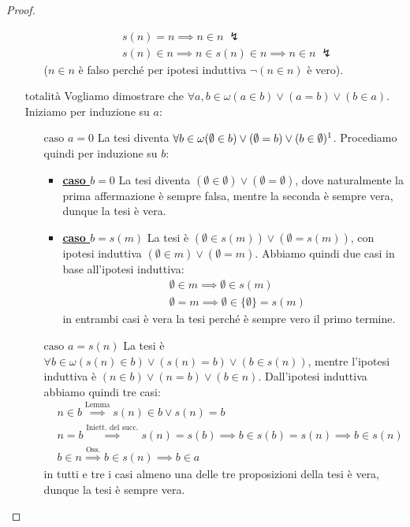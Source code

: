 \begin{proof}
\begin{itemize}
\begin{itemize}
			\[ \begin{split}
				& s(n) = n \implies n \in n \; \lightning\\
				& s(n) \in n \implies n \in s(n) \in n \implies n \in n \; \lightning
			\end{split}
				\]
			($n \in n$ è falso perché per ipotesi induttiva $\neg(n \in n)$ è vero).
		\end{itemize}
		\item[$\boxed{\text{totalità}}$] Vogliamo dimostrare che $\forall a,b \in \omega (a \in b) \lor (a = b) \lor (b \in a)$. Iniziamo per induzione su $a$:
		\begin{itemize}
			\item[$\boxed{\text{caso $a = 0$}}$] La tesi diventa $\forall b \in \omega (\emptyset \in b) \lor (\emptyset = b) \lor (b \in \emptyset) \footnote{Ovviamente quest'ultimo caso è sempre faslo e quindi può essere escluso.}$. Procediamo quindi per induzione su $b$:
			\begin{itemize}
				\item \textbf{\underline{caso $b = 0$}} La tesi diventa $(\emptyset \in \emptyset) \lor (\emptyset = \emptyset)$, dove naturalmente la prima affermazione è sempre falsa, mentre la seconda è sempre vera, dunque la tesi è vera.
				\item \textbf{\underline{caso $b = s(m)$}} La tesi è $(\emptyset \in s(m)) \lor (\emptyset = s(m))$, con ipotesi induttiva $(\emptyset \in m) \lor (\emptyset = m)$. Abbiamo quindi due casi in base all'ipotesi induttiva:
				\[ \begin{split}
					& \emptyset \in m \implies \emptyset \in s(m) \\
					& \emptyset = m \implies \emptyset \in \{\emptyset\} = s(m)
				\end{split}
					\]
				in entrambi casi è vera la tesi perché è sempre vero il primo termine.
			\end{itemize}
			\item[$\boxed{\text{caso $a = s(n)$}}$] La tesi è $\forall b \in \omega (s(n) \in b) \lor (s(n) = b) \lor (b \in s(n))$, mentre l'ipotesi induttiva è $(n \in b) \lor (n = b) \lor (b \in n)$. Dall'ipotesi induttiva abbiamo quindi tre casi:
				\[ \begin{split}
					& n \in b \overset{\text{Lemma}}{\implies} s(n) \in b \lor s(n) = b \\
					& n = b \overset{\text{Iniett. del succ.}}{\implies} s(n) = s(b) \implies b \in s(b) = s(n) \implies b \in s(n)\\
					& b \in n \overset{\text{Oss.}}{\implies} b \in s(n) \implies b \in a 
				\end{split}
					\]
				in tutti e tre i casi almeno una delle tre proposizioni della tesi è vera, dunque la tesi è sempre vera.
		\end{itemize}
	\end{itemize}
\end{proof}

